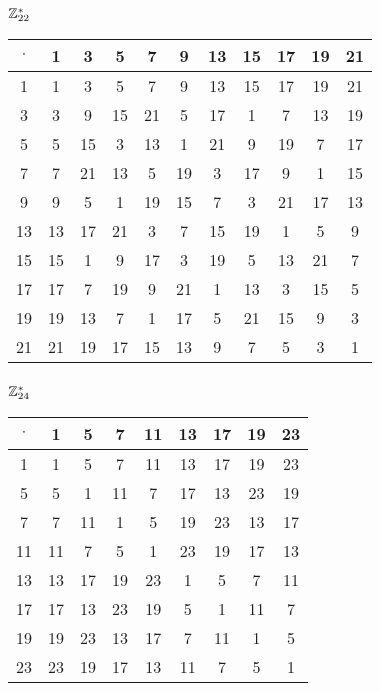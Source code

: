 \subsubsection{$\mathbb{Z}_{22}^*$}
\begin{tabular}{|c|c|c|c|c|c|c|c|c|c|c|}
\hline $\cdot$  & 1 & 3 & 5 & 7 & 9 & 13 & 15 & 17 & 19 & 21\\
\hline 1 & 1 & 3 & 5 & 7 & 9 & 13 & 15 & 17 & 19 & 21\\
\hline 3 & 3 & 9 & 15 & 21 & 5 & 17 & 1 & 7 & 13 & 19\\
\hline 5 & 5 & 15 & 3 & 13 & 1 & 21 & 9 & 19 & 7 & 17\\
\hline 7 & 7 & 21 & 13 & 5 & 19 & 3 & 17 & 9 & 1 & 15\\
\hline 9 & 9 & 5 & 1 & 19 & 15 & 7 & 3 & 21 & 17 & 13\\
\hline 13 & 13 & 17 & 21 & 3 & 7 & 15 & 19 & 1 & 5 & 9\\
\hline 15 & 15 & 1 & 9 & 17 & 3 & 19 & 5 & 13 & 21 & 7\\
\hline 17 & 17 & 7 & 19 & 9 & 21 & 1 & 13 & 3 & 15 & 5\\
\hline 19 & 19 & 13 & 7 & 1 & 17 & 5 & 21 & 15 & 9 & 3\\
\hline 21 & 21 & 19 & 17 & 15 & 13 & 9 & 7 & 5 & 3 & 1\\
\hline
\end{tabular}


\subsubsection{$\mathbb{Z}_{24}^*$}
\begin{tabular}{|c|c|c|c|c|c|c|c|c|}
\hline $\cdot$  & 1 & 5 & 7 & 11 & 13 & 17 & 19 & 23\\
\hline 1 & 1 & 5 & 7 & 11 & 13 & 17 & 19 & 23\\
\hline 5 & 5 & 1 & 11 & 7 & 17 & 13 & 23 & 19\\
\hline 7 & 7 & 11 & 1 & 5 & 19 & 23 & 13 & 17\\
\hline 11 & 11 & 7 & 5 & 1 & 23 & 19 & 17 & 13\\
\hline 13 & 13 & 17 & 19 & 23 & 1 & 5 & 7 & 11\\
\hline 17 & 17 & 13 & 23 & 19 & 5 & 1 & 11 & 7\\
\hline 19 & 19 & 23 & 13 & 17 & 7 & 11 & 1 & 5\\
\hline 23 & 23 & 19 & 17 & 13 & 11 & 7 & 5 & 1\\
\hline
\end{tabular}



